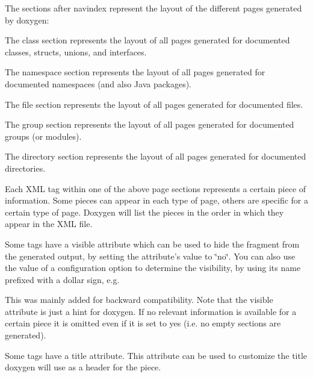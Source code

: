 The sections after {\ttfamily navindex} represent the layout of the different pages generated by doxygen:
\begin{DoxyItemize}
\item The {\ttfamily class} section represents the layout of all pages generated for documented classes, structs, unions, and interfaces.
\item The {\ttfamily namespace} section represents the layout of all pages generated for documented namespaces (and also Java packages).
\item The {\ttfamily file} section represents the layout of all pages generated for documented files.
\item The {\ttfamily group} section represents the layout of all pages generated for documented groups (or modules).
\item The {\ttfamily directory} section represents the layout of all pages generated for documented directories.
\end{DoxyItemize}

Each XML tag within one of the above page sections represents a certain piece of information. Some pieces can appear in each type of page, others are specific for a certain type of page. Doxygen will list the pieces in the order in which they appear in the XML file.

Some tags have a {\ttfamily visible} attribute which can be used to hide the fragment from the generated output, by setting the attribute's value to \char`\"{}no\char`\"{}. You can also use the value of a configuration option to determine the visibility, by using its name prefixed with a dollar sign, e.g. 
 This was mainly added for backward compatibility. Note that the {\ttfamily visible} attribute is just a hint for doxygen. If no relevant information is available for a certain piece it is omitted even if it is set to {\ttfamily yes} (i.e. no empty sections are generated).

Some tags have a {\ttfamily title} attribute. This attribute can be used to customize the title doxygen will use as a header for the piece.

